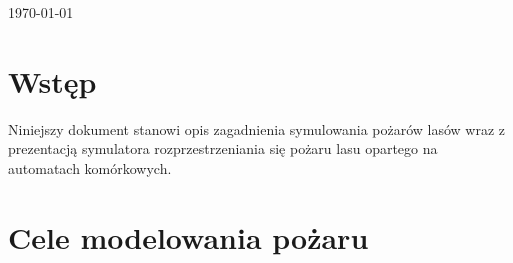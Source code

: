 \documentclass[a4paper, 11pt]{article}
\begin{document}
\begin{titlepage}
		
		
		{\large \today}\\[3cm] %
		
		
		
		
		\vfill %
		
	\end{titlepage}
	
	
	\tableofcontents
	\vfill
	\newpage
	
	
	
	\section{Wstęp}
	\indent
	
	Niniejszy dokument stanowi opis zagadnienia symulowania pożarów lasów wraz z prezentacją symulatora rozprzestrzeniania się pożaru lasu opartego na automatach komórkowych.
	
	\section*{Cele modelowania pożaru}
	\indent
	
\end{document}

